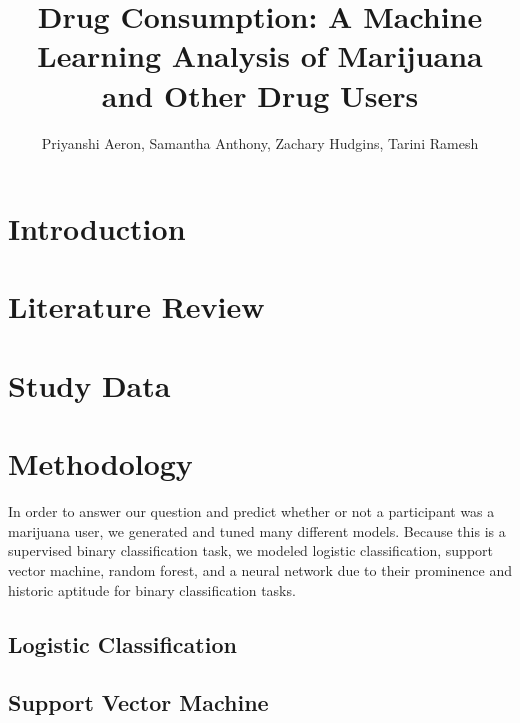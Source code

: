 \documentclass{article}
\title{Drug Consumption: A Machine Learning Analysis of Marijuana 
and Other Drug Users}
\author{Priyanshi Aeron, Samantha Anthony, Zachary Hudgins, Tarini Ramesh}
\date{}
\begin{document}
\maketitle

\section{Introduction}

\section{Literature Review}

\section{Study Data}

\section{Methodology}
In order to answer our question and predict whether or not a participant was a marijuana user, we generated and tuned many different models. Because this is a supervised binary classification task, we modeled logistic classification, support vector machine, random forest, and a neural network due to their prominence and historic aptitude for binary classification tasks.
\subsection{Logistic Classification}
\subsection{Support Vector Machine}
\end{document}
